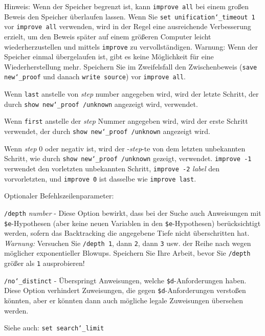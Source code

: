 \begin{sloppypar} %
Hinweis: Wenn der Speicher begrenzt ist, kann \texttt{improve all} bei einem großen Beweis den Speicher überlaufen lassen.  Wenn Sie \texttt{set unification{\char`\_}timeout 1} vor \texttt{improve all} verwenden, wird in der Regel eine ausreichende Verbesserung erzielt, um den Beweis später auf einem größeren Computer leicht wiederherzustellen und mittels \texttt{improve} zu vervollständigen.  Warnung:  Wenn der Speicher einmal übergelaufen ist, gibt es keine Möglichkeit für eine Wiederherstellung mehr.  Speichern Sie im Zweifelsfall den Zwischenbeweis (\texttt{save new{\char`\_}proof} und danach \texttt{write source}) vor \texttt{improve all}. 
\end{sloppypar}

Wenn \texttt{last} anstelle von {\em step} number angegeben wird, wird der letzte Schritt, der durch \texttt{show new{\char`\_}proof /unknown} angezeigt wird, verwendet. 

Wenn \texttt{first} anstelle der {\em step} Nummer angegeben wird, wird der erste Schritt verwendet, der durch \texttt{show new{\char`\_}proof /unknown} angezeigt wird. 

Wenn {\em step} 0 oder negativ ist, wird der -{\em step}-te von dem letzten unbekannten Schritt, wie durch \texttt{show new{\char`\_}proof /unknown} gezeigt, verwendet.  \texttt{improve -1} verwendet den vorletzten unbekannten Schritt, \texttt{improve -2} {\em label} den vorvorletzten, und \texttt{improve 0} ist dasselbe wie \texttt{improve last}. 

Optionaler Befehlszeilenparameter:

    \texttt{/depth} {\em number} - Diese Option bewirkt, dass bei der Suche auch Anweisungen mit \texttt{\$e}-Hypothesen (aber keine neuen Variablen in den \texttt{\$e}-Hypothesen) berücksichtigt werden, sofern das Backtracking die angegebene Tiefe nicht überschritten hat. {\em Warnung:}  Versuchen Sie \texttt{/depth 1}, dann \texttt{2}, dann \texttt{3} usw. der Reihe nach wegen möglicher exponentieller Blowups.  Speichern Sie Ihre Arbeit, bevor Sie \texttt{/depth} größer als \texttt{1} ausprobieren!

    \texttt{/no{\char`\_}distinct} - Überspringt Anweisungen, welche \texttt{\$d}-Anforderungen haben. Diese Option verhindert Zuweisungen, die gegen \texttt{\$d}-Anforderungen verstoßen könnten, aber er könnten dann auch mögliche legale Zuweisungen übersehen werden.

Siehe auch: \texttt{set search{\char`\_}limit}

